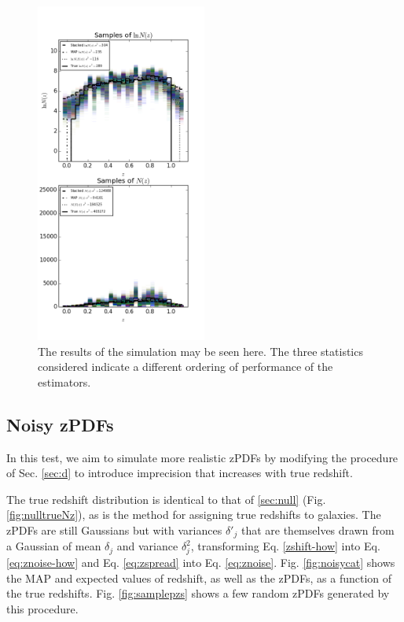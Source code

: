 \documentclass[preprint]{aastex}
\begin{document}
\begin{figure}
\includegraphics[width=0.5\textwidth]{samps-real.png}
\caption{The results of the simulation may be seen here.  The three statistics considered indicate a different ordering of performance of the estimators.}
\label{fig:realparam}
\end{figure}

\clearpage
\subsection{Noisy zPDFs}
\label{sec:noisy}

In this test, we aim to simulate more realistic zPDFs by modifying the procedure of Sec. \ref{sec:d} to introduce imprecision that increases with true redshift.  

The true redshift distribution is identical to that of \ref{sec:null} (Fig. \ref{fig:nulltrueNz}), as is the method for assigning true redshifts to galaxies.  The zPDFs are still Gaussians but with variances $\delta'_{j}$ that are themselves drawn from a Gaussian of mean $\delta_{j}$ and variance $\delta_{j}^{2}$, transforming Eq. \ref{zshift-how} into Eq. \ref{eq:znoise-how} and Eq. \ref{eq:zspread} into Eq. \ref{eq:znoise}.  Fig. \ref{fig:noisycat} shows the MAP and expected values of redshift, as well as the zPDFs, as a function of the true redshifts.  Fig. \ref{fig:samplepzs} shows a few random zPDFs generated by this procedure.
\end{document}
